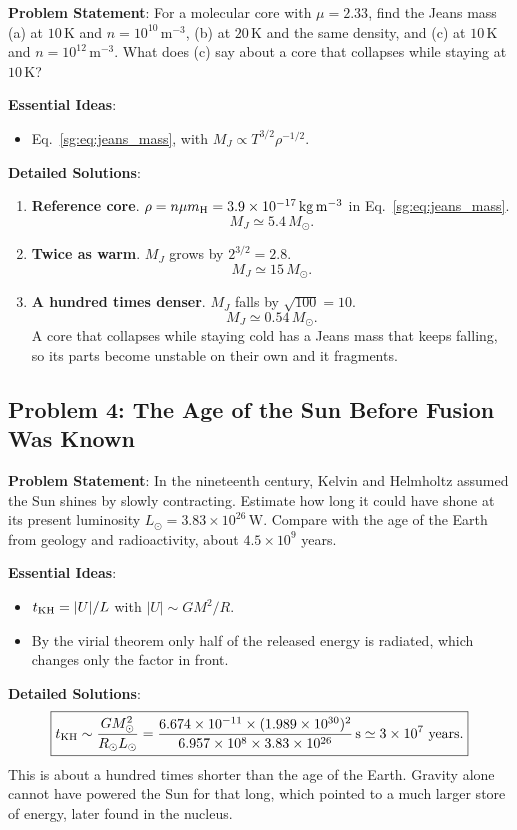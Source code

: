 \textbf{Problem Statement}: For a molecular core with $\mu=2.33$, find the Jeans mass (a) at $10\,\mathrm K$ and $n=10^{10}\,\mathrm{m^{-3}}$, (b) at $20\,\mathrm K$ and the same density, and (c) at $10\,\mathrm K$ and $n=10^{12}\,\mathrm{m^{-3}}$. What does (c) say about a core that collapses while staying at $10\,\mathrm K$?

\textbf{Essential Ideas}:
\begin{itemize}
	\item Eq.~\eqref{sg:eq:jeans_mass}, with $M_J\propto T^{3/2}\rho^{-1/2}$.
\end{itemize}

\textbf{Detailed Solutions}:
\begin{enumerate}[label=(\alph*)]
	\item \textbf{Reference core}. $\rho=n\mu m_{\rm H}=3.9\times10^{-17}\,\mathrm{kg\,m^{-3}}$ in Eq.~\eqref{sg:eq:jeans_mass}.
	\[
	\boxed{M_J\simeq5.4\,M_\odot.}
	\]
	\item \textbf{Twice as warm}. $M_J$ grows by $2^{3/2}=2.8$.
	\[
	\boxed{M_J\simeq15\,M_\odot.}
	\]
	\item \textbf{A hundred times denser}. $M_J$ falls by $\sqrt{100}=10$.
	\[
	\boxed{M_J\simeq0.54\,M_\odot.}
	\]
	A core that collapses while staying cold has a Jeans mass that keeps falling, so its parts become unstable on their own and it fragments.
\end{enumerate}

\subsection{Problem 4: The Age of the Sun Before Fusion Was Known}
\label{sg:prob:kh}

\textbf{Problem Statement}: In the nineteenth century, Kelvin and Helmholtz assumed the Sun shines by slowly contracting. Estimate how long it could have shone at its present luminosity $L_\odot=3.83\times10^{26}\,\mathrm W$. Compare with the age of the Earth from geology and radioactivity, about $4.5\times10^9$ years.

\textbf{Essential Ideas}:
\begin{itemize}
	\item $t_{\rm KH}=|U|/L$ with $|U|\sim GM^2/R$.
	\item By the virial theorem only half of the released energy is radiated, which changes only the factor in front.
\end{itemize}

\textbf{Detailed Solutions}:
\[
\boxed{t_{\rm KH}\sim\frac{GM_\odot^2}{R_\odot L_\odot}=\frac{6.674\times10^{-11}\times(1.989\times10^{30})^2}{6.957\times10^8\times3.83\times10^{26}}\,\mathrm s\simeq3\times10^7\ \text{years}.}
\]
This is about a hundred times shorter than the age of the Earth. Gravity alone cannot have powered the Sun for that long, which pointed to a much larger store of energy, later found in the nucleus.

